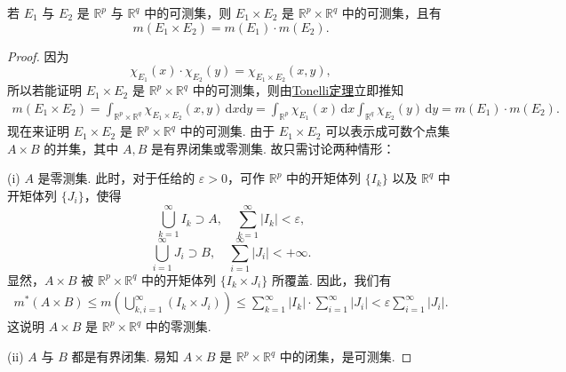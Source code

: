 \documentclass[../../main.tex]{subfiles}%
\begin{document}
\begin{theorem}
若 \( E_1 \) 与 \( E_2 \) 是 \( \mathbb{R}^p \) 与 \( \mathbb{R}^q \) 中的可测集，则 \( E_1 \times E_2 \) 是 \( \mathbb{R}^p \times \mathbb{R}^q \) 中的可测集，且有
\[
m(E_1 \times E_2) = m(E_1) \cdot m(E_2).
\]
\end{theorem}
\begin{proof}

因为
\[
\chi_{E_1}(x) \cdot \chi_{E_2}(y) = \chi_{E_1 \times E_2}(x, y),
\]
所以若能证明 \( E_1 \times E_2 \) 是 \( \mathbb{R}^p \times \mathbb{R}^q \) 中的可测集，则由\hyperref[theorem:Tonelli 定理 非负可测函数的情形]{Tonelli定理}立即推知
\begin{align*}
m(E_1 \times E_2) = \int_{\mathbb{R}^p \times \mathbb{R}^q} \chi_{E_1 \times E_2}(x, y) \, \mathrm{d}x\mathrm{d}y 
= \int_{\mathbb{R}^p} \chi_{E_1}(x) \, \mathrm{d}x \int_{\mathbb{R}^q} \chi_{E_2}(y) \, \mathrm{d}y = m(E_1) \cdot m(E_2).
\end{align*}
现在来证明 \( E_1 \times E_2 \) 是 \( \mathbb{R}^p \times \mathbb{R}^q \) 中的可测集. 由于 \( E_1 \times E_2 \) 可以表示成可数个点集 \( A \times B \) 的并集，其中 \( A, B \) 是有界闭集或零测集. 故只需讨论两种情形：

(i) \( A \) 是零测集. 此时，对于任给的 \( \varepsilon > 0 \)，可作 \( \mathbb{R}^p \) 中的开矩体列 \( \{ I_k \} \) 以及 \( \mathbb{R}^q \) 中开矩体列 \( \{ J_i \} \)，使得
\[
\bigcup_{k = 1}^{\infty} I_k \supset A, \quad \sum_{k = 1}^{\infty} |I_k| < \varepsilon,
\]
\[
\bigcup_{i = 1}^{\infty} J_i \supset B, \quad \sum_{i = 1}^{\infty} |J_i| < +\infty.
\]
显然，\( A \times B \) 被 \( \mathbb{R}^p \times \mathbb{R}^q \) 中的开矩体列 \( \{ I_k \times J_i \} \) 所覆盖. 因此，我们有
\begin{align*}
m^*(A \times B) \leqslant m\left( \bigcup_{k, i = 1}^{\infty} (I_k \times J_i) \right) 
\leqslant \sum_{k = 1}^{\infty} |I_k| \cdot \sum_{i = 1}^{\infty} |J_i| < \varepsilon \sum_{i = 1}^{\infty} |J_i|.
\end{align*}
这说明 \( A \times B \) 是 \( \mathbb{R}^p \times \mathbb{R}^q \) 中的零测集.

(ii) \( A \) 与 \( B \) 都是有界闭集. 易知 \( A \times B \) 是 \( \mathbb{R}^p \times \mathbb{R}^q \) 中的闭集，是可测集.

\end{proof}
\end{document}
